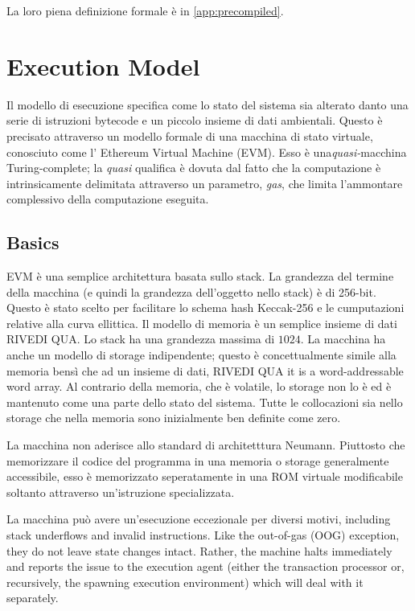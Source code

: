 \documentclass[9pt,oneside]{amsart}
\begin{document}
\begin{multicols}{2}
La loro piena definizione formale è in \ref{app:precompiled}.

\section{Execution Model} \label{ch:model}

Il modello di esecuzione specifica come lo stato del sistema sia alterato danto una serie di istruzioni bytecode e un piccolo insieme di dati ambientali. Questo è precisato attraverso un modello formale di una macchina di stato virtuale, conosciuto come l' Ethereum Virtual Machine (EVM). Esso è una\textit{quasi-}macchina Turing-complete; la \textit{quasi} qualifica è dovuta dal fatto che la computazione è intrinsicamente delimitata attraverso un parametro, \textit{gas}, che limita l'ammontare complessivo della computazione eseguita.

\subsection{Basics}

EVM è una semplice architettura basata sullo stack. La grandezza del termine della macchina (e quindi la grandezza dell'oggetto nello stack) è di 256-bit. Questo è stato scelto per facilitare lo schema hash Keccak-256 e le cumputazioni relative alla curva ellittica. Il modello di memoria è un semplice insieme di dati RIVEDI QUA. Lo stack ha una grandezza massima di $1024$. La macchina ha anche un modello di storage indipendente; questo è concettualmente simile alla memoria  bensì che ad un insieme di dati, RIVEDI QUA it is a word-addressable word array. Al contrario della memoria, che è volatile, lo storage non lo è ed è mantenuto come una parte dello stato del sistema. Tutte le collocazioni sia nello storage che nella memoria sono inizialmente ben definite come zero.

La macchina non aderisce allo standard di architetttura Neumann. Piuttosto che memorizzare il codice del programma in una memoria o storage generalmente accessibile, esso è memorizzato seperatamente in una ROM virtuale modificabile soltanto attraverso un'istruzione specializzata.

La macchina può avere un'esecuzione eccezionale per diversi motivi, including stack underflows and invalid instructions. Like the out-of-gas (OOG) exception, they do not leave state changes intact. Rather, the machine halts immediately and reports the issue to the execution agent (either the transaction processor or, recursively, the spawning execution environment) which will deal with it separately.


\end{multicols}
\end{document}
